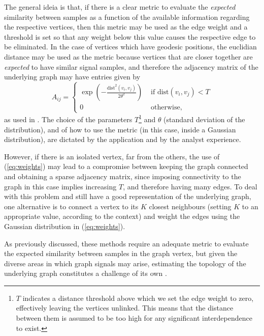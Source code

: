 The general ideia is that, if there is a clear metric to evaluate the \emph{expected} similarity between samples as a function of the available information regarding the respective vertices, then this metric may be used as the edge weight and a threshold is set so that any weight below this value causes the respective edge to be eliminated. In the case of vertices which have geodesic positions, the euclidian distance may be used as the metric because vertices that are closer together are \emph{expected} to have similar signal samples, and therefore the adjacency matrix of the underlying graph may have entries given by
\begin{equation}
\label{eq:weights}
A_{ij} =
\begin{cases}
\displaystyle
\exp \left(- \frac{\text{dist}^2(v_i, v_j)}{2 \theta^2}\right)& \text{ if } \text{dist}(v_i, v_j) < T \\ 
0 & \text{ otherwise},
\end{cases}
\end{equation}
as used in \cite{shuman2013emerging}. The choice of the parameters $ T $\footnote{$ T $ indicates a distance threshold above which we set the edge weight to zero, effectively leaving the vertices unlinked. This means that the distance between them is assumed to be too high for any significant interdependence to exist.} and $ \theta $ (standard deviation of the distribution), and of how to use the metric (in this case, inside a Gaussian distribution), are dictated by the application and by the analyst experience. 

However, if there is an isolated vertex, far from the others, the use of (\ref{eq:weights}) may lead to a compromise between keeping the graph connected and obtaining a sparse adjacency matrix, since imposing connectivity to the graph in this case implies increasing $ T $, and therefore having many edges. To deal with this problem and still have a good representation of the underlying graph, one alternative is to connect a vertex to its $ K $ closest neighbours (setting $ K $ to an appropriate value, according to the context) and weight the edges using the Gaussian distribution in (\ref{eq:weights}).

As previously discussed, these methods require an adequate metric to evaluate the expected similarity between samples in the graph vertex, but given the diverse areas in which graph signals may arise, estimating the topology of the  underlying graph constitutes a challenge of its own \cite{mei2016signal,Sardellitti2016}.

